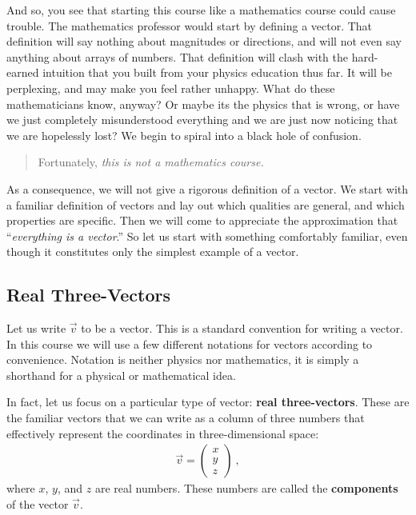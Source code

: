 \documentclass[12pt]{article}
\begin{document}
And so, you see that starting this course like a mathematics course could cause trouble. The mathematics professor would start by defining a vector. That definition will say nothing about magnitudes or directions, and will not even say anything about arrays of numbers. That definition will clash with the hard-earned intuition that you built from your physics education thus far. It will be perplexing, and may make you feel rather unhappy. What do these mathematicians know, anyway? Or maybe its the physics that is wrong, or have we just completely misunderstood everything and we are just now noticing that we are hopelessly lost? We begin to spiral into a black hole of confusion.

\begin{quote}
Fortunately, \emph{this is not a mathematics course.}
\end{quote}

As a consequence, we will not give a rigorous definition of a vector. We start with a familiar definition of vectors and lay out which qualities are general, and which properties are specific. Then we will come to appreciate the approximation that ``\emph{everything is a vector}.'' So let us start with something comfortably familiar, even though it constitutes only the simplest example of a vector.

\subsection{Real Three-Vectors}

Let us write $\vec{v}$ to be a vector. This is a standard convention for writing a vector. In this course we will use a few different notations for vectors according to convenience. Notation is neither physics nor mathematics, it is simply a shorthand for a physical or mathematical idea. 

In fact, let us focus on a particular type of vector: \textbf{real three-vectors}. These are the familiar vectors that we can write as a column of three numbers that effectively represent the coordinates in three-dimensional space:
\begin{align}
    \vec{v} = 
    \begin{pmatrix}
        x\\ y\\ z
    \end{pmatrix} \ ,
\end{align}
where $x$, $y$, and $z$ are real numbers. These numbers are called the \textbf{components} of the vector $\vec{v}$.
\end{document}
